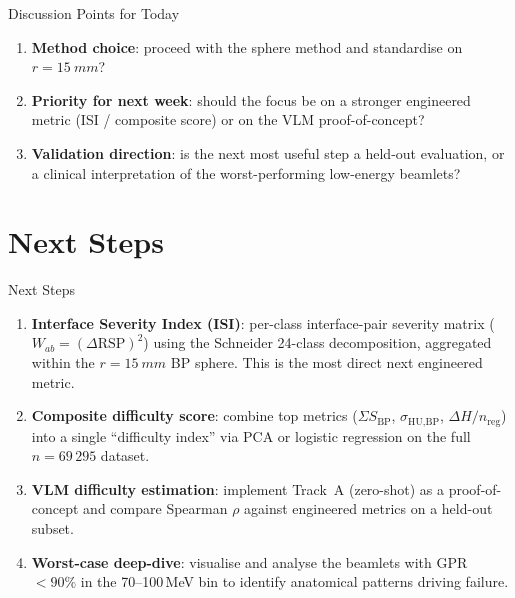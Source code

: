 \documentclass[aspectratio=169, 10pt]{beamer}
\begin{document}
\begin{frame}{Discussion Points for Today}
  \begin{enumerate}
    \item \textbf{Method choice}: proceed with the sphere method and
          standardise on $r = \SI{15}{mm}$?

    \vspace{6pt}
    \item \textbf{Priority for next week}: should the focus be on
          a stronger engineered metric (ISI / composite score) or on
          the VLM proof-of-concept?

    \vspace{6pt}
    \item \textbf{Validation direction}: is the next most useful step
          a held-out evaluation, or a clinical interpretation of the
          worst-performing low-energy beamlets?
  \end{enumerate}
\end{frame}

\section{Next Steps}

\begin{frame}{Next Steps}
  \begin{enumerate}
    \item \textbf{Interface Severity Index (ISI)}:
          per-class interface-pair severity matrix
          ($W_{ab} = (\Delta\mathrm{RSP})^2$) using the Schneider
          24-class decomposition, aggregated within the $r = \SI{15}{mm}$
          BP sphere. This is the most direct next engineered metric.

    \vspace{6pt}
    \item \textbf{Composite difficulty score}: combine top metrics
          ($\Sigma S_{\text{BP}}$, $\sigma_{\text{HU,BP}}$,
          $\Delta H / n_{\text{reg}}$) into a single ``difficulty index''
          via PCA or logistic regression on the full $n = 69\,295$
          dataset.

    \vspace{6pt}
    \item \textbf{VLM difficulty estimation}: implement Track~A
          (zero-shot) as a proof-of-concept and compare Spearman $\rho$
          against engineered metrics on a held-out subset.

    \vspace{6pt}
    \item \textbf{Worst-case deep-dive}: visualise and analyse the
          beamlets with GPR $< 90\%$ in the 70--100\,MeV bin to
          identify anatomical patterns driving failure.
  \end{enumerate}
\end{frame}
\end{document}
